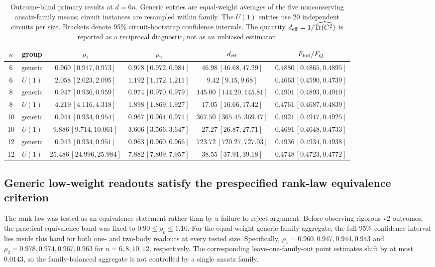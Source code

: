 \begin{table}[t]
\caption{Outcome-blind primary results at $d=6n$.  Generic entries are
equal-weight averages of the five nonconserving ansatz-family means;
circuit instances are resampled within family.  The $U(1)$ entries use
20 independent circuits per size.  Brackets denote 95\% circuit-bootstrap
confidence intervals.  The quantity $d_{\rm eff}=1/\widehat{\mathrm{Tr}(C^2)}$
is reported as a reciprocal diagnostic, not as an unbiased estimator.}
\label{tab:v2-primary}
\centering
\begin{tabular}{c c c c c c}
\hline\hline
$n$ & group & $\rho_1$ & $\rho_2$ & $d_{\rm eff}$ & $F_{\rm full}/F_Q$ \\
\hline
6  & generic & $0.960\,[0.947,0.973]$ & $0.978\,[0.972,0.984]$ & $46.98\,[46.68,47.29]$ & $0.4880\,[0.4865,0.4895]$ \\
6  & $U(1)$  & $2.058\,[2.023,2.095]$ & $1.192\,[1.172,1.211]$ & $9.42\,[9.15,9.68]$ & $0.4663\,[0.4590,0.4739]$ \\
8  & generic & $0.947\,[0.936,0.959]$ & $0.974\,[0.970,0.979]$ & $145.00\,[144.20,145.81]$ & $0.4901\,[0.4893,0.4910]$ \\
8  & $U(1)$  & $4.219\,[4.116,4.318]$ & $1.898\,[1.869,1.927]$ & $17.05\,[16.66,17.42]$ & $0.4761\,[0.4687,0.4839]$ \\
10 & generic & $0.944\,[0.934,0.954]$ & $0.967\,[0.964,0.971]$ & $367.50\,[365.45,369.47]$ & $0.4921\,[0.4917,0.4925]$ \\
10 & $U(1)$  & $9.886\,[9.714,10.061]$ & $3.606\,[3.566,3.647]$ & $27.27\,[26.87,27.71]$ & $0.4691\,[0.4648,0.4733]$ \\
12 & generic & $0.943\,[0.934,0.951]$ & $0.963\,[0.960,0.966]$ & $723.72\,[720.27,727.03]$ & $0.4936\,[0.4934,0.4938]$ \\
12 & $U(1)$  & $25.486\,[24.996,25.984]$ & $7.882\,[7.809,7.957]$ & $38.55\,[37.91,39.18]$ & $0.4748\,[0.4723,0.4772]$ \\
\hline\hline
\end{tabular}
\end{table}

\subsection{Generic low-weight readouts satisfy the prespecified rank-law equivalence criterion}

The rank law was tested as an equivalence statement rather than by a
failure-to-reject argument.  Before observing rigorous-v2 outcomes, the
practical equivalence band was fixed to
$0.90\leq\rho_k\leq1.10$.  For the equal-weight generic-family aggregate,
the full 95\% confidence interval lies inside this band for both one- and
two-body readouts at every tested size.  Specifically,
$\rho_1=0.960,0.947,0.944,0.943$ and
$\rho_2=0.978,0.974,0.967,0.963$ for $n=6,8,10,12$, respectively.
The corresponding leave-one-family-out point estimates shift by at most
$0.0143$, so the family-balanced aggregate is not controlled by a single
ansatz family.

